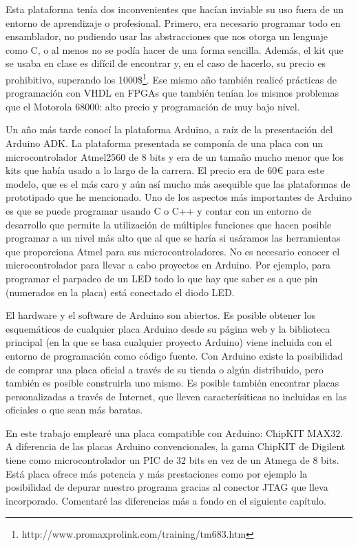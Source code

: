 Esta plataforma tenía dos inconvenientes que hacían inviable su uso fuera de un entorno de aprendizaje o profesional.  Primero, era necesario programar todo en ensamblador, no pudiendo usar las abstracciones que nos otorga un lenguaje como C, o al menos no se podía hacer de una forma sencilla.  Además, el kit que se usaba en clase es difícil de encontrar y, en el caso de hacerlo, su precio es prohibitivo, superando los 1000\$\footnote{http://www.promaxprolink.com/training/tm683.htm}.  Ese mismo año también realicé prácticas de programación con VHDL en FPGAs que también tenían los mismos problemas que el Motorola 68000: alto precio y programación de muy bajo nivel.

Un año más tarde conocí la plataforma Arduino, a raíz de la presentación del Arduino ADK. La plataforma presentada se componía de una placa con un microcontrolador Atmel2560 de 8 bits y era de un tamaño mucho menor que los kits que había usado a lo largo de la carrera.  El precio era de 60\euro{} para este modelo, que es el más caro y aún así mucho más asequible que las plataformas de prototipado que he mencionado.  
Uno de los aspectos más importantes de Arduino es que se puede programar usando C o C++ y contar con un entorno de desarrollo que permite la utilización de múltiples funciones que hacen posible programar a un nivel más alto que al que se haría si usáramos las herramientas que proporciona Atmel para sus microcontroladores.  No es necesario conocer el microcontrolador para llevar a cabo proyectos en Arduino.  Por ejemplo, para programar el parpadeo de un LED todo lo que hay que saber es a que pin (numerados en la placa) está conectado el diodo LED.

El hardware y el software de Arduino son abiertos.  Es posible obtener los esquemáticos de cualquier placa Arduino desde su página web y la biblioteca principal (en la que se basa cualquier proyecto Arduino) viene incluida con el entorno de programación como código fuente.  Con Arduino existe la posibilidad de comprar una placa oficial a través de su tienda o algún distribuido, pero también es posible construirla uno mismo.  Es posible también encontrar placas personalizadas a través de Internet, que lleven caracterísiticas no incluidas en las oficiales o que sean más baratas.

En este trabajo emplearé una placa compatible con Arduino: ChipKIT MAX32.  A diferencia de las placas Arduino convencionales, la gama ChipKIT de Digilent tiene como microcontrolador un PIC de 32 bits en vez de un Atmega de 8 bits.  Está placa ofrece más potencia y más prestaciones como por ejemplo la posibilidad de depurar nuestro programa gracias al conector JTAG que lleva incorporado. Comentaré las diferencias más a fondo en el siguiente capítulo.

